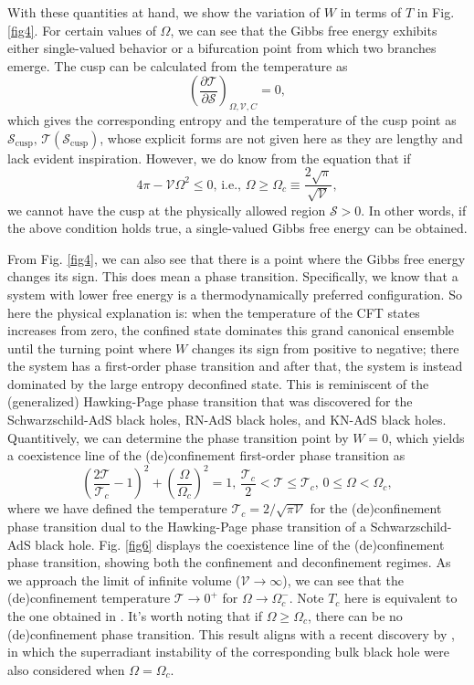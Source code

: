 \documentclass[a4paper,11pt]{article}
\newcommand{\fig}[1]{Fig. \ref{#1}}
\def\T{\mathcal{T}} \def\O{\mathcal{O}} \def\S{\mathcal{S}}\def\J{\mathcal{J}}\def\V{\mathcal{V}}\def\Q{\mathcal{Q}}\def\F{\mathcal{F}}
\begin{document}
With these quantities at hand, we show the variation of $W$ in terms of $T$ in \fig{fig4}. For certain values of $\Omega$, we can see that the Gibbs free energy exhibits either single-valued behavior or a bifurcation point from which two branches emerge. The cusp can be calculated from the temperature as 
\begin{equation}
\left(\frac{\partial \T}{\partial \S}\right)_{\Omega,\mathcal{V},C}=0,
\end{equation}
which gives the corresponding entropy and the temperature of the cusp point as $\S_{\mathrm{cusp}},\,\T(\S_{\mathrm{cusp}})$, whose explicit forms are not given here as they are lengthy and lack evident inspiration. However, we do know from the equation that if 
\begin{equation}
4 \pi -\mathcal{V} \Omega ^2\leqslant 0, \,\mathrm{i.e.,}\, \Omega\geqslant\Omega_c\equiv \frac{2 \sqrt{ \pi }}{\sqrt{\mathcal{V}}},
\end{equation}
we cannot have the cusp at the physically allowed region $\S>0$. In other words, if the above condition holds true, a single-valued Gibbs free energy can be obtained.


From \fig{fig4}, we can also see that there is a point where the Gibbs free energy changes its sign. This does mean a phase transition. Specifically, we know that a system with lower free energy  is a thermodynamically preferred configuration. So here the physical explanation is: when the temperature of the CFT states increases from zero, the confined state dominates this grand canonical ensemble until the turning point where $W$ changes its sign from positive to negative; there the system has a first-order phase transition and after that, the system is instead dominated by the large entropy deconfined state. This is reminiscent of the  (generalized) Hawking-Page phase transition that was discovered for the Schwarzschild-AdS black holes, RN-AdS black holes, and KN-AdS black holes. Quantitively, we can determine the phase transition point by $W=0$, which yields a coexistence line of the (de)confinement first-order phase transition as
\begin{equation}
\left(\frac{2\T}{\T_c}-1\right)^2+\left(\frac{\Omega }{\Omega_c}\right)^2=1,\, \frac{\T_c}{2}< \T\leqslant \T_c,\, 0\leqslant\Omega< \Omega_c,
\end{equation}
where we have defined the temperature $\T_c=2/\sqrt{\pi\V}$ for the (de)confinement phase transition dual to the Hawking-Page phase transition of a Schwarzschild-AdS black hole. \fig{fig6} displays the coexistence line of the (de)confinement phase transition, showing both the confinement and deconfinement regimes. As we approach the limit of infinite volume ($\V\to\infty$), we can see that the (de)confinement temperature $\T\to 0^+$ for  $\Omega\to\Omega_c^-$. Note $T_c$ here is equivalent to the one obtained in \cite{Cong:2021jgb}. It's worth noting that if $\Omega\geqslant\Omega_c$, there can be no (de)confinement phase transition. This result aligns with a recent discovery by \cite{Ahmed:2023dnh}, in which the superradiant instability of the corresponding bulk black hole were also considered when $\Omega=\Omega_c$.
 
\end{document}
